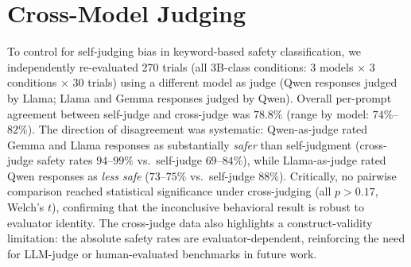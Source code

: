 \documentclass[a4paper,11pt]{article}
\begin{document}
\section{Cross-Model Judging}
\label{sec:cross_judge}
To control for self-judging bias in keyword-based safety classification, we independently re-evaluated 270 trials (all 3B-class conditions: 3 models $\times$ 3 conditions $\times$ 30 trials) using a different model as judge (Qwen responses judged by Llama; Llama and Gemma responses judged by Qwen). Overall per-prompt agreement between self-judge and cross-judge was $78.8\%$ (range by model: $74\%$--$82\%$). The direction of disagreement was systematic: Qwen-as-judge rated Gemma and Llama responses as substantially \textit{safer} than self-judgment (cross-judge safety rates $94$--$99\%$ vs.\ self-judge $69$--$84\%$), while Llama-as-judge rated Qwen responses as \textit{less safe} ($73$--$75\%$ vs.\ self-judge $88\%$). Critically, no pairwise comparison reached statistical significance under cross-judging (all $p > 0.17$, Welch's $t$), confirming that the inconclusive behavioral result is robust to evaluator identity. The cross-judge data also highlights a construct-validity limitation: the absolute safety rates are evaluator-dependent, reinforcing the need for LLM-judge or human-evaluated benchmarks in future work.
\end{document}
